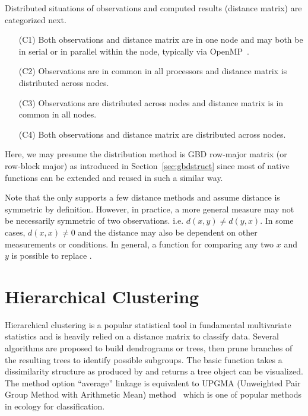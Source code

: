 Distributed situations of observations and computed results (distance
matrix) are categorized next.
\begin{itemize}
\item[(C1)]
      Both observations and distance matrix are in one node and may both be
      in serial or in parallel within the node, typically via
      OpenMP~\citep{OpenMP}.
\item[(C2)]
      Observations are in common in all processors
      and distance matrix is distributed across nodes.
\item[(C3)]
      Observations are distributed across nodes
      and distance matrix is in common in all nodes.
\item[(C4)]
      Both observations and distance matrix are distributed
      across nodes.
\end{itemize}
Here, we may presume the distribution method is GBD row-major matrix (or
row-block major) as introduced in Section~\ref{sec:gbdstruct} since most of
native  functions can be extended and reused in such a
similar way.

Note that the  only supports a few distance methods and assume
distance is symmetric by definition. However,
in practice, a more general measure may not be necessarily
symmetric of two observations. i.e. $d(x, y) \neq d(y, x)$.
In some cases, $d(x, x) \neq 0$ and the distance may also be dependent
on other measurements or conditions. In general, a function for comparing
any two $x$ and $y$ is possible to replace .



\section{Hierarchical Clustering}

Hierarchical clustering is a popular statistical tool in fundamental
multivariate statistics and is heavily relied on a distance matrix to classify
data. Several algorithms are proposed to build dendrograms or trees, then
prune branches of the resulting trees to identify possible subgroups.
The basic function 
takes a dissimilarity structure as
produced by  and returns a tree object can be visualized.
The method option ``average'' linkage is equivalent to
UPGMA (Unweighted Pair Group Method with Arithmetic Mean)
method~\citep{Sokal1958} which is one of popular methods in ecology for
classification.

